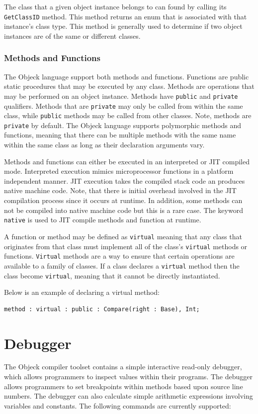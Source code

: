 \documentclass[12pt]{article}
\begin{document}
The class that a given object instance belongs to can found by calling its \texttt{GetClassID} method.  This method returns an enum that is associated with that instance's class type.  This method is generally used to determine if two object instances are of the same or different classes.

\subsubsection{Methods and Functions}
The Objeck language support both methods and functions.  Functions are public static procedures that may be executed by any class.  Methods are operations that may be performed on an object instance.  Methods have \texttt{public} and \texttt{private} qualifiers.  Methods that are \texttt{private} may only be called from within the same class, while \texttt{public} methods may be called from other classes.  Note, methods are \texttt{private} by default. The Objeck language supports polymorphic methods and functions, meaning that there can be multiple methods with the same name within the same class as long as their declaration arguments vary.

Methods and functions can either be executed in an interpreted or JIT compiled mode. Interpreted execution mimics microprocessor functions in a platform independent manner. JIT execution takes the compiled stack code an produces native machine code. Note, that there is initial overhead involved in the JIT compilation process since it occurs at runtime. In addition, some methods can not be compiled into native machine code but this is a rare case.  The keyword \texttt{native} is used to JIT compile methods and function at runtime.

A function or method may be defined as \texttt{virtual} meaning that any class that originates from that class must implement all of the class's \texttt{virtual} methods or functions.  \texttt{Virtual} methods are a way to ensure that certain operations are available to a family of classes. If a class declares a \texttt{virtual} method then the class become \texttt{virtual}, meaning that it cannot be directly instantiated.

Below is an example of declaring a virtual method:
\begin{verbatim}
method : virtual : public : Compare(right : Base), Int;
\end{verbatim}

\section{Debugger}
The Objeck compiler toolset contains a simple interactive read-only debugger, which allows programmers to inspect values within their programs.  The debugger allows programmers to set breakpoints within methods based upon source line numbers.  The debugger can also calculate simple arithmetic expressions involving variables and constants. The following commands are currently supported:
\end{document}
